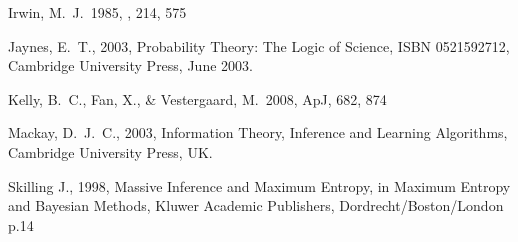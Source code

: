 \documentclass[manuscript]{aastex}
\begin{document}
\begin{thebibliography}{99}
 Irwin, M.~J.\ 1985, \mnras, 214, 
575 

 Jaynes, E.~T., 2003, Probability Theory: The
Logic of Science, ISBN 0521592712, Cambridge University Press, June 2003.

 Kelly, B.~C., Fan, X., 
\& Vestergaard, M.\ 2008, ApJ, 682, 874 

 Mackay, D.~J.~C., 2003, Information Theory,
Inference and Learning Algorithms, Cambridge University Press, UK.

Skilling J., 1998, Massive Inference and Maximum Entropy, in Maximum Entropy 
and Bayesian Methods, Kluwer Academic Publishers, Dordrecht/Boston/London p.14
\end{thebibliography}
\end{document}
